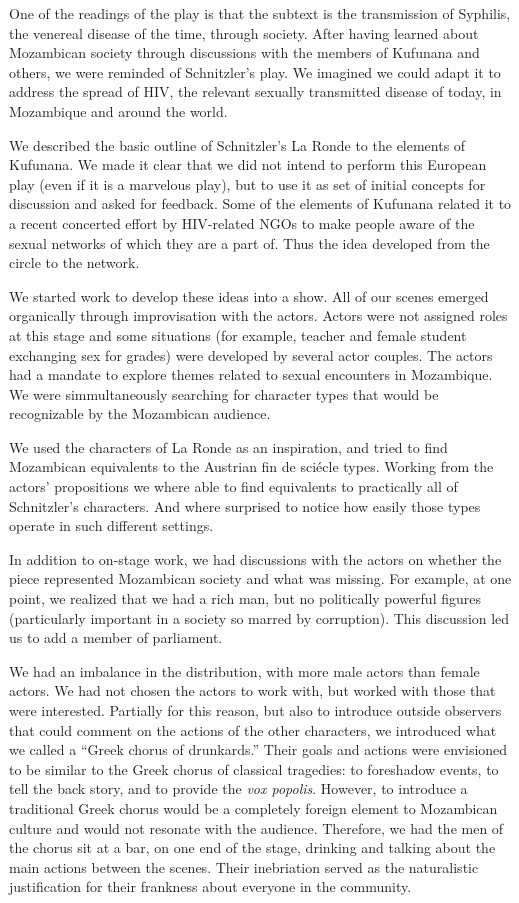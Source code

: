 \documentclass[article,twocolumn]{memoir}
\begin{document}
One of the readings of the play is that the subtext is the transmission of
Syphilis, the venereal disease of the time, through society. After having
learned about Mozambican society through discussions with the members of
Kufunana and others, we were reminded of Schnitzler's play. We imagined we
could adapt it to address the spread of HIV, the relevant sexually transmitted
disease of today, in Mozambique and around the world.

We described the basic outline of Schnitzler's La Ronde to the elements of
Kufunana. We made it clear that we did not intend to perform this European play
(even if it is a marvelous play), but to use it as set of initial concepts for
discussion and asked for feedback. Some of the elements of Kufunana related it
to a recent concerted effort by HIV-related NGOs to make people aware of the
sexual networks of which they are a part of. Thus the idea developed from the
circle to the network.

We started work to develop these ideas into a show. All of our scenes emerged
organically through improvisation with the actors. Actors were not assigned
roles at this stage and some situations (for example, teacher and female student
exchanging sex for grades) were developed by several actor couples. The actors
had a mandate to explore themes related to sexual encounters in Mozambique. We
were simmultaneously searching for character types that would be recognizable
by the Mozambican audience.

We used the characters of La Ronde as an inspiration, and tried to find
Mozambican equivalents to the Austrian fin de sci\'{e}cle types. Working from
the actors' propositions we where able to find equivalents to practically all
of Schnitzler's characters. And where surprised to notice how easily those
types operate in such different settings.

In addition to on-stage work, we had discussions with the actors on whether the
piece represented Mozambican society and what was missing. For example, at one
point, we realized that we had a rich man, but no politically powerful figures
(particularly important in a society so marred by corruption). This discussion
led us to add a member of parliament.

We had an imbalance in the distribution, with more male actors than female
actors. We had not chosen the actors to work with, but worked with those that
were interested. Partially for this reason, but also to introduce outside
observers that could comment on the actions of the other characters, we
introduced what we called a ``Greek chorus of drunkards.'' Their goals and
actions were envisioned to be similar to the Greek chorus of classical
tragedies: to foreshadow events, to tell the back story, and to provide the
\textit{vox popolis}. However, to introduce a traditional Greek chorus would be a
completely foreign element to Mozambican culture and would not resonate with
the audience. Therefore, we had the men of the chorus sit at a bar, on one end
of the stage, drinking and talking about the main actions between the scenes.
Their inebriation served as the naturalistic justification for their frankness
about everyone in the community.
\end{document}
